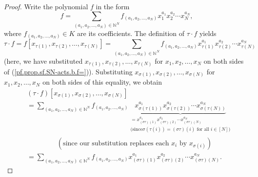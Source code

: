 \begin{fineprint}
\begin{proof}
Write the polynomial $f$ in the form
\begin{equation}
f=\sum_{\left(  a_{1},a_{2},\ldots,a_{N}\right)  \in\mathbb{N}^{N}}f_{\left(
a_{1},a_{2},\ldots,a_{N}\right)  }x_{1}^{a_{1}}x_{2}^{a_{2}}\cdots
x_{N}^{a_{N}}, \label{pf.prop.sf.SN-acts.b.f=}%
\end{equation}
where $f_{\left(  a_{1},a_{2},\ldots,a_{N}\right)  }\in K$ are its
coefficients. The definition of $\tau\cdot f$ yields%
\[
\tau\cdot f=f\left[  x_{\tau\left(  1\right)  },x_{\tau\left(  2\right)
},\ldots,x_{\tau\left(  N\right)  }\right]  =\sum_{\left(  a_{1},a_{2}%
,\ldots,a_{N}\right)  \in\mathbb{N}^{N}}f_{\left(  a_{1},a_{2},\ldots
,a_{N}\right)  }x_{\tau\left(  1\right)  }^{a_{1}}x_{\tau\left(  2\right)
}^{a_{2}}\cdots x_{\tau\left(  N\right)  }^{a_{N}}%
\]
(here, we have substituted $x_{\tau\left(  1\right)  },x_{\tau\left(
2\right)  },\ldots,x_{\tau\left(  N\right)  }$ for $x_{1},x_{2},\ldots,x_{N}$
on both sides of (\ref{pf.prop.sf.SN-acts.b.f=})). Substituting $x_{\sigma
\left(  1\right)  },x_{\sigma\left(  2\right)  },\ldots,x_{\sigma\left(
N\right)  }$ for $x_{1},x_{2},\ldots,x_{N}$ on both sides of this equality, we
obtain%
\begin{align*}
&  \left(  \tau\cdot f\right)  \left[  x_{\sigma\left(  1\right)  }%
,x_{\sigma\left(  2\right)  },\ldots,x_{\sigma\left(  N\right)  }\right] \\
&  =\sum_{\left(  a_{1},a_{2},\ldots,a_{N}\right)  \in\mathbb{N}^{N}%
}f_{\left(  a_{1},a_{2},\ldots,a_{N}\right)  }\underbrace{x_{\sigma\left(
\tau\left(  1\right)  \right)  }^{a_{1}}x_{\sigma\left(  \tau\left(  2\right)
\right)  }^{a_{2}}\cdots x_{\sigma\left(  \tau\left(  N\right)  \right)
}^{a_{N}}}_{\substack{=x_{\left(  \sigma\tau\right)  \left(  1\right)
}^{a_{1}}x_{\left(  \sigma\tau\right)  \left(  2\right)  }^{a_{2}}\cdots
x_{\left(  \sigma\tau\right)  \left(  N\right)  }^{a_{N}}\\\text{(since
}\sigma\left(  \tau\left(  i\right)  \right)  =\left(  \sigma\tau\right)
\left(  i\right)  \text{ for all }i\in\left[  N\right]  \text{)}}}\\
&  \ \ \ \ \ \ \ \ \ \ \ \ \ \ \ \ \ \ \ \ \left(  \text{since our
substitution replaces each }x_{i}\text{ by }x_{\sigma\left(  i\right)
}\right) \\
&  =\sum_{\left(  a_{1},a_{2},\ldots,a_{N}\right)  \in\mathbb{N}^{N}%
}f_{\left(  a_{1},a_{2},\ldots,a_{N}\right)  }x_{\left(  \sigma\tau\right)
\left(  1\right)  }^{a_{1}}x_{\left(  \sigma\tau\right)  \left(  2\right)
}^{a_{2}}\cdots x_{\left(  \sigma\tau\right)  \left(  N\right)  }^{a_{N}}.

\end{align*}
\end{proof}
\end{fineprint}
